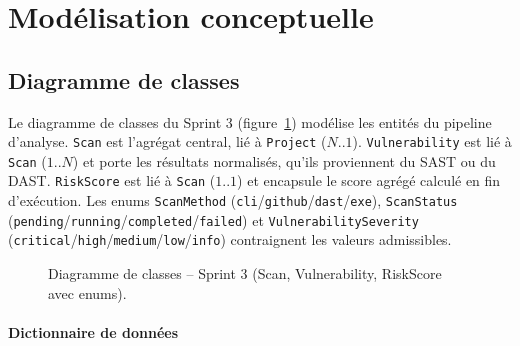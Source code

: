 \section{Modélisation conceptuelle}

\subsection{Diagramme de classes}

Le diagramme de classes du Sprint 3 (figure~\ref{fig:sprint3-class}) modélise les entités du pipeline d'analyse. \texttt{Scan} est l'agrégat central, lié à \texttt{Project} (\(N..1\)). \texttt{Vulnerability} est lié à \texttt{Scan} (\(1..N\)) et porte les résultats normalisés, qu'ils proviennent du SAST ou du DAST. \texttt{RiskScore} est lié à \texttt{Scan} (\(1..1\)) et encapsule le score agrégé calculé en fin d'exécution. Les enums \texttt{ScanMethod} (\texttt{cli}/\texttt{github}/\texttt{dast}/\texttt{exe}), \texttt{ScanStatus} (\texttt{pending}/\texttt{running}/\texttt{completed}/\texttt{failed}) et \texttt{VulnerabilitySeverity} (\texttt{critical}/\texttt{high}/\texttt{medium}/\texttt{low}/\texttt{info}) contraignent les valeurs admissibles.

\begin{figure}[H]
\centering
\fbox{\rule{0pt}{2in}\rule{0.9\linewidth}{0pt}}
\caption{Diagramme de classes -- Sprint 3 (Scan, Vulnerability, RiskScore avec enums).}
\label{fig:sprint3-class}
\end{figure}

\paragraph{Dictionnaire de données}

